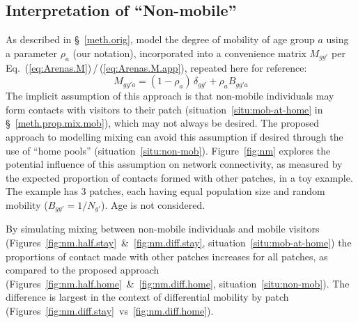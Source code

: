 \subsection{Interpretation of ``Non-mobile''}\label{app.non-mob}
As described in \S~\ref{meth.orig}, \citet{Arenas2020} model the degree of mobility of age group $a$
using a parameter $\rho_a$ (our notation),
incorporated into a convenience matrix $M_{gg'}$ per Eq.~(\ref{eq:Arenas.M})\,/\,(\ref{eq:Arenas.M.app}),
repeated here for reference:
\begin{equation}\label{eq:Arenas.M.app}
  M_{gg'a} = (1-\rho_a)\,\delta_{gg'} + \rho_a B_{gg'a}
\end{equation}
The implicit assumption of this approach is that
non-mobile individuals may form contacts with visitors to their patch
(situation~\ref{situ:mob-at-home} in \S~\ref{meth.prop.mix.mob}), which may not always be desired.
The proposed approach to modelling mixing can avoid this assumption if desired
through the use of ``home pools'' (situation~\ref{situ:non-mob}).
Figure~\ref{fig:nm} explores the potential influence of this assumption on network connectivity,
as measured by the expected proportion of contacts formed with other patches, in a toy example.
The example has 3 patches, each having equal population size and random mobility ($B_{gg'} = 1/N_{g'}$).
Age is not considered.
\par
By simulating mixing between non-mobile individuals and mobile visitors
(Figures~\ref{fig:nm.half.stay}~\&~\ref{fig:nm.diff.stay}, situation~\ref{situ:mob-at-home})
the proportions of contact made with other patches increases for all patches,
as compared to the proposed approach
(Figures~\ref{fig:nm.half.home}~\&~\ref{fig:nm.diff.home}, situation~\ref{situ:non-mob}).
The difference is largest in the context of differential mobility by patch
(Figures~\ref{fig:nm.diff.stay}~vs~\ref{fig:nm.diff.home}).
\par
